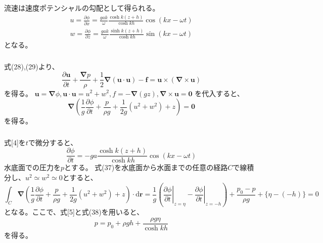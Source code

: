 \documentclass[a4paper]{jsarticle}
\begin{document}
\subsection{}
\subsubsection{}
流速は速度ポテンシャルの勾配として得られる。
\begin{align}
  u = \frac{\partial \phi}{\partial x}
  = \frac{g a k}{\omega} \frac{\cosh k (z + h)}{\cosh kh} \cos (k x - \omega t) \\
  w = \frac{\partial \phi}{\partial z}
  = \frac{g a k}{\omega} \frac{\sinh k (z + h)}{\cosh kh} \sin (k x - \omega t)
\end{align}
となる。

\subsubsection{}
式(28),(29)より、
\begin{equation}
  \frac{\partial \bm{u}}{\partial t} + \frac{\bm{\nabla} p}{\rho} + \frac{1}{2} \bm{\nabla} (\bm{u} \cdot \bm{u}) - \bm{f}
  = \bm{u} \times (\bm{\nabla \times \bm{u}})
\end{equation}
を得る。
$\bm{u} = \bm{\nabla} \phi, \bm{u} \cdot \bm{u} = u^2 + w^2, f = -\bm{\nabla} (g z), \bm{\nabla} \times \bm{u} = \bm{0}$
を代入すると、
\begin{equation}
  \bm{\nabla} \left(\frac{1}{g} \frac{\partial \phi}{\partial t} + 
  \frac{p}{\rho g} + \frac{1}{2g}\left(u^2 + w^2\right) + z\right) = \bm{0}
\end{equation}
を得る。

\subsubsection{}
式[4]を$t$で微分すると、
\begin{equation}
\frac{\partial \phi}{\partial t} = -g a \frac{\cosh k(z + h)}{\cosh kh} \cos (kx - \omega t)
\end{equation}
水底面での圧力を$p$とする。
式(37)を水底面から水面までの任意の経路$C$で線積分し、$u^2 \simeq w^2 \simeq 0$とすると、
\begin{equation}
  \int_C \bm{\nabla} \left(\frac{1}{g} \frac{\partial \phi}{\partial t} + 
  \frac{p}{\rho g} + \frac{1}{2g}\left(u^2 + w^2\right) + z\right) \cdot \mathrm{d} \bm{r}
  = \frac{1}{g} \left(\left.\frac{\partial \phi}{\partial t}\right|_{z = \eta} - \left.\frac{\partial \phi}{\partial t}\right|_{z = -h}\right)
  + \frac{p_0 - p}{\rho g} + \{\eta - (-h)\} = 0
\end{equation}
となる。ここで、式[5]と式(38)を用いると、
\begin{equation}
  p = p_0 + \rho g h + \frac{\rho g \eta}{\cosh k h}
\end{equation}
を得る。
\end{document}
